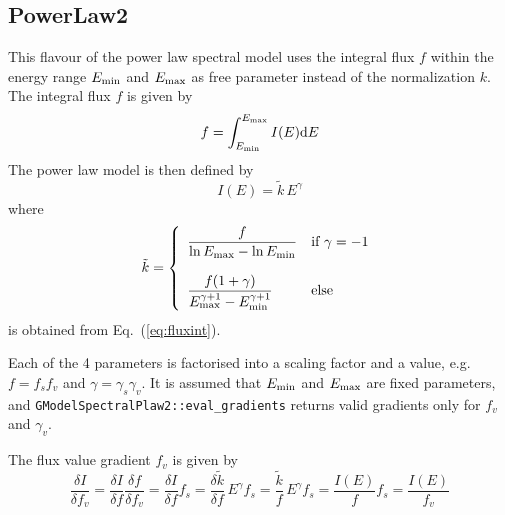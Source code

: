 \documentclass{article}[12pt,a4]
\begin{document}
\subsection{PowerLaw2}

This flavour of the power law spectral model uses the integral flux $f$ within the
energy range $E_{\rm min}$ and $E_{\rm max}$ as free parameter instead of
the normalization $k$.
The integral flux $f$ is given by
\begin{equation}
f = \int_{E_{\rm min}}^{E_{\rm max}} I(E) {\rm d}E
\label{eq:fluxint}
\end{equation}
The power law model is then defined by
\begin{equation}
I(E) = \tilde{k} \, E^{\gamma}
\end{equation}
where
\begin{equation}
   \tilde{k} = \left \{
   \begin{array}{l l}
      \displaystyle
      \frac{f}{\ln E_{\rm max} - \ln E_{\rm min}} 
        & \mbox{if $\gamma = -1$} \\
     \\
     \displaystyle
      \frac{f (1+\gamma)}{E_{\rm max}^{\gamma+1}-E_{\rm min}^{\gamma+1}} 
        & \mbox{else}
   \end{array}
   \right .
\end{equation}
is obtained from Eq.~(\ref{eq:fluxint}).

Each of the 4 parameters is factorised into a scaling factor and a value, e.g.
$f=f_s f_v$ and $\gamma=\gamma_s \gamma_v$.
It is assumed that $E_{\rm min}$ and $E_{\rm max}$ are fixed parameters,
and {\tt GModelSpectralPlaw2::eval\_gradients} returns valid gradients only for 
$f_v$ and $\gamma_v$.

The flux value gradient $f_v$ is given by
\begin{equation}
\frac{\delta I}{\delta f_v} = 
  \frac{\delta I}{\delta f} \frac{\delta f}{\delta f_v} = 
  \frac{\delta I}{\delta f} f_s = 
  \frac{\delta \tilde{k}}{\delta f} \, E^{\gamma} f_s = 
  \frac{\tilde{k}}{f} \, E^{\gamma} f_s = 
  \frac{I(E)}{f} f_s =
  \frac{I(E)}{f_v}
\end{equation}
\end{document}
